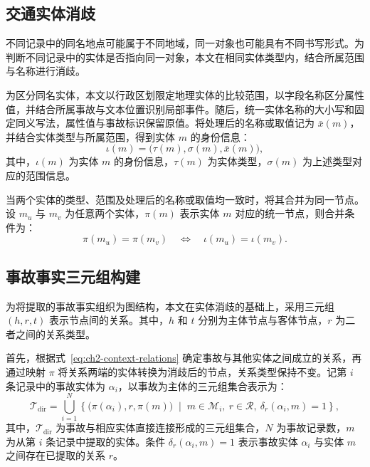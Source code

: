 \subsection{交通实体消歧}

不同记录中的同名地点可能属于不同地域，同一对象也可能具有不同书写形式。为判断不同记录中的实体是否指向同一对象，本文在相同实体类型内，结合所属范围与名称进行消歧。

为区分同名实体，本文以行政区划限定地理实体的比较范围，以字段名称区分属性值，并结合所属事故与文本位置识别局部事件。随后，统一实体名称的大小写和固定同义写法，属性值与事故标识保留原值。将处理后的名称或取值记为 $\bar{x}(m)$，并结合实体类型与所属范围，得到实体 $m$ 的身份信息：
\begin{equation}
\iota(m)=\bigl(\tau(m),\sigma(m),\bar{x}(m)\bigr),
\label{eq:ch2-entity-identity}
\end{equation}
其中，$\iota(m)$ 为实体 $m$ 的身份信息，$\tau(m)$ 为实体类型，$\sigma(m)$ 为上述类型对应的范围信息。

当两个实体的类型、范围及处理后的名称或取值均一致时，将其合并为同一节点。设 $m_u$ 与 $m_v$ 为任意两个实体，$\pi(m)$ 表示实体 $m$ 对应的统一节点，则合并条件为：
\begin{equation}
\pi(m_u)=\pi(m_v)
\quad\Longleftrightarrow\quad
\iota(m_u)=\iota(m_v).
\label{eq:ch2-mention-node}
\end{equation}

\subsection{事故事实三元组构建}

为将提取的事故事实组织为图结构，本文在实体消歧的基础上，采用三元组 $(h,r,t)$ 表示节点间的关系。其中，$h$ 和 $t$ 分别为主体节点与客体节点，$r$ 为二者之间的关系类型。

首先，根据式~\eqref{eq:ch2-context-relations} 确定事故与其他实体之间成立的关系，再通过映射 $\pi$ 将关系两端的实体转换为消歧后的节点，关系类型保持不变。记第 $i$ 条记录中的事故实体为 $\alpha_i$，以事故为主体的三元组集合表示为：
\begin{equation}
\mathcal{T}_{\mathrm{dir}}
=\bigcup_{i=1}^{N}
\left\{
\bigl(\pi(\alpha_i),r,\pi(m)\bigr)
\;\middle|\;
m\in\mathcal{M}_i,\ r\in\mathcal{R},\ \delta_r(\alpha_i,m)=1
\right\},
\end{equation}
其中，$\mathcal{T}_{\mathrm{dir}}$ 为事故与相应实体直接连接形成的三元组集合，$N$ 为事故记录数，$m$ 为从第 $i$ 条记录中提取的实体。条件 $\delta_r(\alpha_i,m)=1$ 表示事故实体 $\alpha_i$ 与实体 $m$ 之间存在已提取的关系 $r$。

